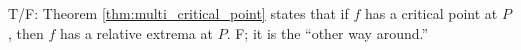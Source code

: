 {T/F: Theorem \ref{thm:multi_critical_point} states that if $f$ has a critical point at $P$, then $f$ has a relative extrema at $P$.
}
{
F; it is the ``other way around.''
}